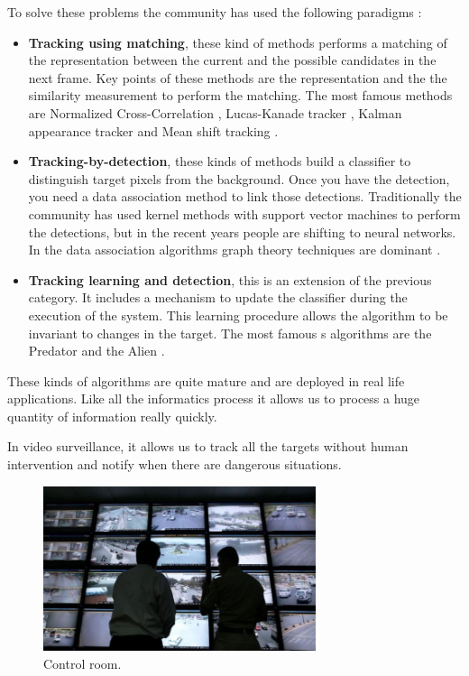 To solve these problems the community has used the following paradigms \cite{visualTrackingSurvey}:

\begin{itemize}

\item \textbf{Tracking using matching}, these kind of methods performs a matching of the representation between the current and the possible candidates in the next frame. Key points of these methods are the representation and the the similarity measurement to perform the matching. The most famous methods are Normalized Cross-Correlation \cite{trackNcc}, Lucas-Kanade tracker \cite{klt}, Kalman appearance tracker \cite{kalmm} and Mean shift tracking  \cite{meanshift}. 

\item \textbf{Tracking-by-detection}, these kinds of methods build a classifier to distinguish target pixels from the background. Once you have the detection, you need a data association method to link those detections. Traditionally the community has used kernel methods with support vector machines \cite{struc} to perform the detections, but in the recent years people are shifting to neural networks. In the data association algorithms graph theory techniques are dominant \cite{dataAsso1} \cite{dataAsso2}.


\item \textbf{Tracking learning and detection}, this is an extension of the previous category. It includes a mechanism to update the classifier during the execution of the system. This learning procedure allows the algorithm to be invariant to changes in the target. The most famous s algorithms are the Predator \cite{tld} and the Alien \cite{alien}.



\end{itemize}


These kinds of algorithms are quite mature and are deployed in real life applications. Like all the informatics process it allows us to process a huge quantity of information really quickly.

In video surveillance, it allows us to track all the targets without human intervention and notify when there are dangerous situations. 

\begin{figure}[H]
\centering         
\includegraphics[width=8cm]{aplicaciones/policias.jpg}
\caption{Control room.} \label{introTracking1}
\end{figure}


